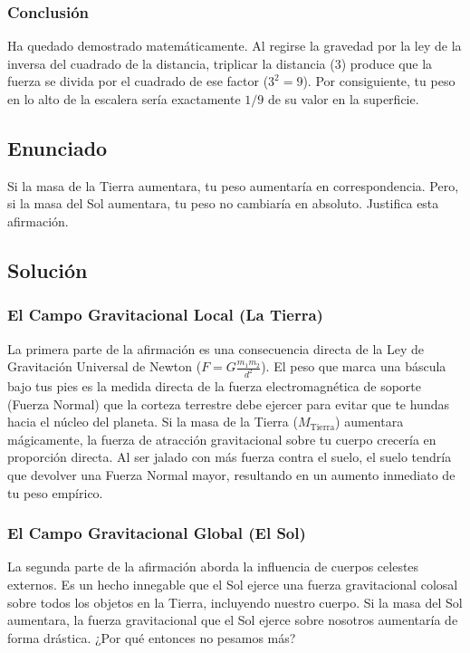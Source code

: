 \documentclass[12pt]{article}
\begin{document}
\subsubsection*{Conclusión}
Ha quedado demostrado matemáticamente. Al regirse la gravedad por la ley de la inversa del cuadrado de la distancia, triplicar la distancia ($3$) produce que la fuerza se divida por el cuadrado de ese factor ($3^2 = 9$). Por consiguiente, tu peso en lo alto de la escalera sería exactamente $1/9$ de su valor en la superficie.

\newpage

\subsection*{Enunciado}
Si la masa de la Tierra aumentara, tu peso aumentaría en correspondencia. Pero, si la masa del Sol aumentara, tu peso no cambiaría en absoluto. Justifica esta afirmación.

\subsection*{Solución}

\subsubsection*{El Campo Gravitacional Local (La Tierra)}
La primera parte de la afirmación es una consecuencia directa de la Ley de Gravitación Universal de Newton ($F = G \frac{m_1 m_2}{d^2}$). El peso que marca una báscula bajo tus pies es la medida directa de la fuerza electromagnética de soporte (Fuerza Normal) que la corteza terrestre debe ejercer para evitar que te hundas hacia el núcleo del planeta. Si la masa de la Tierra ($M_{\text{Tierra}}$) aumentara mágicamente, la fuerza de atracción gravitacional sobre tu cuerpo crecería en proporción directa. Al ser jalado con más fuerza contra el suelo, el suelo tendría que devolver una Fuerza Normal mayor, resultando en un aumento inmediato de tu peso empírico.

\subsubsection*{El Campo Gravitacional Global (El Sol)}
La segunda parte de la afirmación aborda la influencia de cuerpos celestes externos. Es un hecho innegable que el Sol ejerce una fuerza gravitacional colosal sobre todos los objetos en la Tierra, incluyendo nuestro cuerpo. Si la masa del Sol aumentara, la fuerza gravitacional que el Sol ejerce sobre nosotros aumentaría de forma drástica. ¿Por qué entonces no pesamos más?
\end{document}
